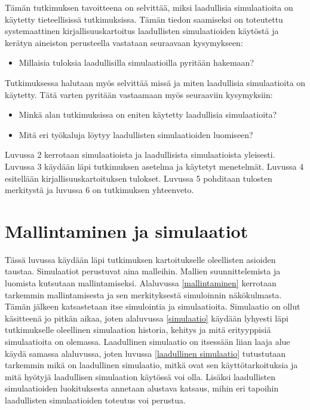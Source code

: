 \documentclass[utf8]{gradu3}
\begin{document}
Tämän tutkimuksen tavoitteena on selvittää, miksi laadullisia simulaatioita 
on käytetty tieteellisissä tutkimuksissa. Tämän tiedon saamiseksi on
toteutettu systemaattinen kirjallisuuskartoitus 
laadullisten simulaatioiden käytöstä ja kerätyn aineiston perusteella vastataan 
seuraavaan kysymykseen:
\begin{itemize}
    \item Millaisia tuloksia laadullisilla simulaatioilla pyritään hakemaan?
\end{itemize}

Tutkimuksessa halutaan myös selvittää missä ja miten laadullisia simulaatioita
on käytetty. Tätä varten pyritään vastaamaan myös seuraaviin kysymyksiin:
\begin{itemize}
    \item Minkä alan tutkimuksissa on eniten käytetty laadullisia simulaatioita?
    \item Mitä eri työkaluja löytyy laadullisten simulaatioiden luomiseen?
\end{itemize}

Luvussa 2 kerrotaan simulaatioista ja laadullisista simulaatioista yleisesti. Luvussa 3 käydään läpi tutkimuksen asetelma ja käytetyt menetelmät. Luvussa 4 esitellään kirjallisuuskartoituksen tulokset. Luvussa 5 pohditaan tulosten merkitystä ja luvussa 6 on tutkimuksen yhteenveto.

\chapter{Mallintaminen ja simulaatiot}
Tässä luvussa käydään läpi tutkimuksen kartoitukselle oleellisten asioiden taustaa. 
Simulaatiot perustuvat aina malleihin. Mallien suunnittelemista ja luomista 
kutsutaan mallintamiseksi. Alaluvussa \ref{mallintaminen} kerrotaan tarkemmin 
mallintamisesta ja sen merkityksestä simuloinnin näkökulmasta. 
Tämän jälkeen katsastetaan itse simulointia ja simulaatioita.
Simulaatio on ollut käsitteenä jo pitkän aikaa, joten alaluvussa
\ref{simulaatio} käydään lyhyesti läpi tutkimukselle oleellinen simulaation historia, 
kehitys ja mitä erityyppisiä simulaatioita on olemassa. 
Laadullinen simulaatio on itsessään liian laaja alue käydä samassa alaluvussa, joten
luvussa \ref{laadullinen simulaatio} tutustutaan tarkemmin 
mikä on laadullinen simulaatio, mitkä ovat sen käyttötarkoituksia 
ja mitä hyötyjä laadullisen simulaation käytössä voi olla. 
Lisäksi laadullisten simulaatioiden luokituksesta annetaan alustava katsaus,
mihin eri tapoihin laadullisten simulaatioiden toteutus voi perustua.
\end{document}
